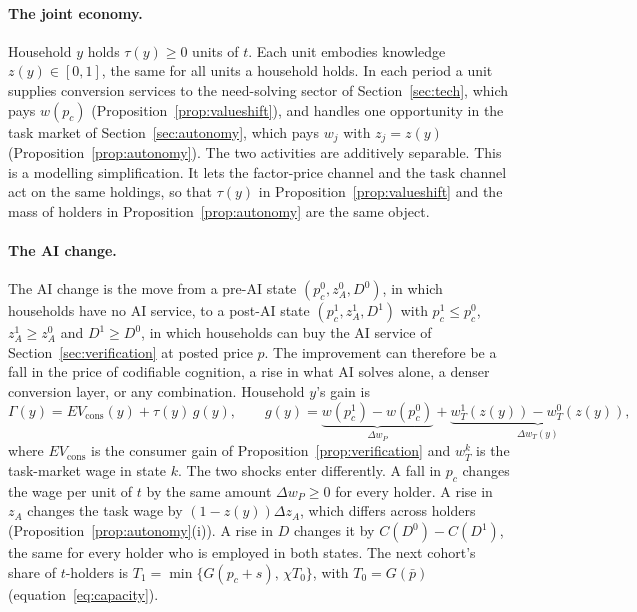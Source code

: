 \documentclass[12pt]{article}
\theoremstyle{remark}
\begin{document}
\paragraph{The joint economy.} Household $y$ holds $\tau(y)\ge0$ units of $t$. Each unit embodies knowledge $z(y)\in[0,1]$, the same for all units a household holds. In each period a unit supplies conversion services to the need-solving sector of Section~\ref{sec:tech}, which pays $w(p_c)$ (Proposition~\ref{prop:valueshift}), and handles one opportunity in the task market of Section~\ref{sec:autonomy}, which pays $w_j$ with $z_j=z(y)$ (Proposition~\ref{prop:autonomy}). The two activities are additively separable. This is a modelling simplification. It lets the factor-price channel and the task channel act on the same holdings, so that $\tau(y)$ in Proposition~\ref{prop:valueshift} and the mass of holders in Proposition~\ref{prop:autonomy} are the same object.

\paragraph{The AI change.} The AI change is the move from a pre-AI state $(p_c^0,z_A^0,D^0)$, in which households have no AI service, to a post-AI state $(p_c^1,z_A^1,D^1)$ with $p_c^1\le p_c^0$, $z_A^1\ge z_A^0$ and $D^1\ge D^0$, in which households can buy the AI service of Section~\ref{sec:verification} at posted price $p$. The improvement can therefore be a fall in the price of codifiable cognition, a rise in what AI solves alone, a denser conversion layer, or any combination. Household $y$'s gain is
\begin{equation}\label{eq:G}
\Gamma(y)=EV_{\text{cons}}(y)+\tau(y)\,g(y),\qquad g(y)=\underbrace{w(p_c^1)-w(p_c^0)}_{\Delta w_P}+\underbrace{w_T^1(z(y))-w_T^0(z(y))}_{\Delta w_T(y)},
\end{equation}
where $EV_{\text{cons}}$ is the consumer gain of Proposition~\ref{prop:verification} and $w_T^k$ is the task-market wage in state $k$. The two shocks enter differently. A fall in $p_c$ changes the wage per unit of $t$ by the same amount $\Delta w_P\ge0$ for every holder. A rise in $z_A$ changes the task wage by $(1-z(y))\Delta z_A$, which differs across holders (Proposition~\ref{prop:autonomy}(i)). A rise in $D$ changes it by $C(D^0)-C(D^1)$, the same for every holder who is employed in both states. The next cohort's share of $t$-holders is $T_1=\min\{G(p_c+s),\,\chi T_0\}$, with $T_0=G(\bar p)$ (equation~\eqref{eq:capacity}).
\end{document}
